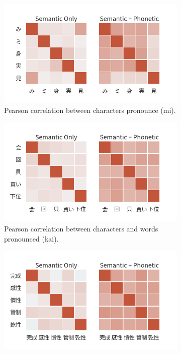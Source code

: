 \begin{figure}[t]
    \centering
    \begin{subfigure}[b]{0.49\textwidth}
        \centering
        \includegraphics[width=\textwidth]{../images/corr_ja1.png}
        \caption{Pearson correlation between characters pronounce (mi).}
        \label{fig:corr_ja1}
    \end{subfigure}
    \hfill
    \begin{subfigure}[b]{0.49\textwidth}
        \centering
        \includegraphics[width=\textwidth]{../images/corr_ja2.png}
        \caption{Pearson correlation between characters and words pronounced (kai).}
        \label{fig:corr_ja2}
    \end{subfigure}
    \begin{subfigure}[b]{0.49\textwidth}
        \centering
        \includegraphics[width=\textwidth]{../images/corr_ja3.png}

\end{subfigure}
\end{figure}
